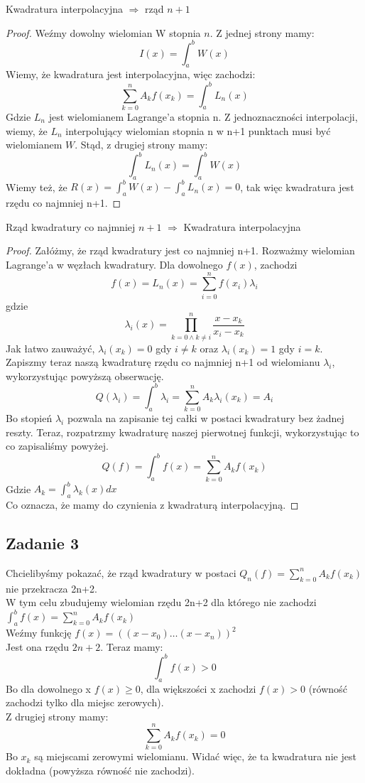 \documentclass[a4paper]{article}
\begin{document}
Kwadratura interpolacyjna $\Rightarrow$ rząd $n+1$
\begin{proof}
Weźmy dowolny wielomian W stopnia $n$. Z jednej strony mamy:
$$I(x)=\int_a^b W(x)$$
Wiemy, że kwadratura jest interpolacyjna, więc zachodzi:
$$\sum\limits_{k=0}^{n}A_kf(x_k) = \int_a^b L_n(x) $$
Gdzie $L_n$ jest wielomianem Lagrange'a stopnia n. Z jednoznaczności interpolacji, wiemy, że $L_n$ interpolujący wielomian stopnia n w n+1 punktach musi być wielomianem $W$. Stąd, z drugiej strony mamy: $$ \int_a^b L_n(x) = \int_a^b W(x)$$
Wiemy też, że $R(x)=\int_a^b W(x) - \int_a^b L_n(x) = 0$, tak więc kwadratura jest rzędu co najmniej n+1.
\end{proof}
\clearpage
Rząd kwadratury co najmniej $n+1$ $\Rightarrow$ Kwadratura interpolacyjna
\begin{proof}
Załóżmy, że rząd kwadratury jest co najmniej n+1. Rozważmy wielomian Lagrange'a w węzłach kwadratury.
Dla dowolnego $f(x)$, zachodzi $$f(x)=L_n(x)=\sum\limits_{i=0}^n f(x_i) \lambda_i$$ gdzie $$\lambda_i(x) = \prod_{k=0 \wedge k\neq i}^n \frac{x-x_k}{x_i-x_k}$$
Jak łatwo zauważyć, $\lambda_i(x_k)=0$ gdy $i\neq k$ oraz $\lambda_i(x_k)=1$ gdy $i = k$.\\
Zapiszmy teraz naszą kwadraturę rzędu co najmniej n+1 od wielomianu $\lambda_i$, wykorzystując powyższą obserwację.
$$Q(\lambda_i)=\int_a^b \lambda_i = \sum\limits_{k=0}^n A_k \lambda_i(x_k)=A_i$$
Bo stopień $\lambda_i$ pozwala na zapisanie tej całki w postaci kwadratury bez żadnej reszty. Teraz, rozpatrzmy kwadraturę naszej pierwotnej funkcji, wykorzystując to co zapisaliśmy powyżej.
$$Q(f) = \int_a^b f(x) = \sum\limits_{k=0}^n A_k f(x_k)$$
Gdzie $A_k=\int_a^b \lambda_k(x) dx$\\
Co oznacza, że mamy do czynienia z kwadraturą interpolacyjną.

\end{proof}
\subsection*{Zadanie 3}
Chcielibyśmy pokazać, że rząd kwadratury w postaci $Q_n(f)=\sum\limits_{k=0}^{n}A_kf(x_k)$ nie przekracza 2n+2.\\
W tym celu zbudujemy wielomian rzędu 2n+2 dla którego nie zachodzi $\int_a^b f(x) = \sum\limits_{k=0}^{n}A_kf(x_k)$\\
Weźmy funkcję $f(x)=\left( (x-x_0)\dots(x-x_n) \right)^2$\\
Jest ona rzędu $2n+2$. Teraz mamy:
$$\int_a^b f(x) > 0 $$
Bo dla dowolnego x $f(x)\geq 0$, dla większości x zachodzi $f(x)>0$ (równość zachodzi tylko dla miejsc zerowych).\\
Z drugiej strony mamy:
$$\sum\limits_{k=0}^{n}A_kf(x_k) = 0$$
Bo $x_k$ są miejscami zerowymi wielomianu. Widać więc, że ta kwadratura nie jest dokładna (powyższa równość nie zachodzi).
\clearpage
\end{document}
